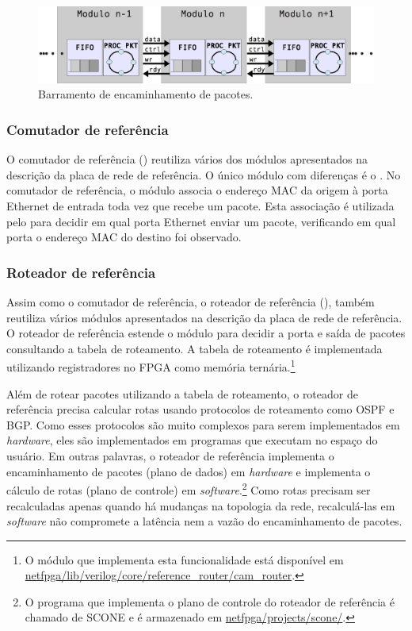 \begin{figure}
\centering
\includegraphics[scale=0.6,angle=0]{figures/modulos/fifo.eps}
\caption{Barramento de encaminhamento de pacotes.}
\label{fig:arch.pipe.sinais}
\end{figure}


\subsubsection*{Comutador de referência}

O comutador de referência () reutiliza vários dos
módulos apresentados na descrição da placa de rede de referência.  O
único módulo com diferenças é o .  No
comutador de referência, o módulo  associa o
endereço MAC da origem à porta Ethernet de entrada toda vez que recebe
um pacote.  Esta associação é utilizada pelo 
para decidir em qual porta Ethernet enviar um pacote, verificando em
qual porta o endereço MAC do destino foi observado.

\subsubsection*{Roteador de referência}

Assim como o comutador de referência, o roteador de referência
(), também reutiliza vários módulos apresentados
na descrição da placa de rede de referência.  O roteador de referência
estende o módulo  para decidir a porta e saída
de pacotes consultando a tabela de roteamento.  A tabela de roteamento é
implementada utilizando registradores no FPGA como memória
ternária.\footnote{O módulo que implementa esta funcionalidade está
disponível em
\url{netfpga/lib/verilog/core/reference_router/cam_router}.}

Além de rotear pacotes utilizando a tabela de roteamento, o roteador de
referência precisa calcular rotas usando protocolos de roteamento como
OSPF e BGP.  Como esses protocolos são muito complexos para serem
implementados em \emph{hardware}, eles são implementados em programas
que executam no espaço do usuário.  Em outras palavras, o roteador de
referência implementa o encaminhamento de pacotes (plano de dados) em
\emph{hardware} e implementa o cálculo de rotas (plano de controle) em
\emph{software}.\footnote{O programa que implementa o plano de controle
do roteador de referência é chamado de SCONE e é armazenado em
\url{netfpga/projects/scone/}.} Como rotas precisam ser recalculadas
apenas quando há mudanças na topologia da rede, recalculá-las em
\emph{software} não compromete a latência nem a vazão do encaminhamento
de pacotes.

